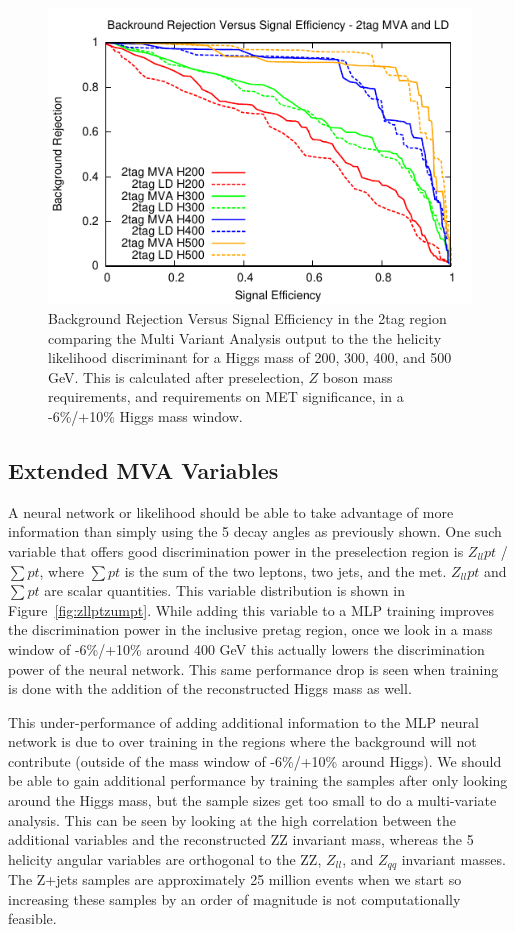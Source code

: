 \begin{figure}[htb!]
\begin{center}
\centerline{
\includegraphics[width=0.6\linewidth]{Optimization/plots/NN/2tag_MVA_LD_ROC.pdf}
}
\caption{
Background Rejection Versus Signal Efficiency in the 2tag region comparing the Multi Variant Analysis output to the the helicity likelihood discriminant for a Higgs mass of 200, 300, 400, and 500 GeV. This is calculated after preselection, $Z$ boson mass requirements, and requirements on MET significance, in a -6\%/+10\% Higgs mass window.
}
\label{fig:nn_2tag_ROC}
\end{center}
\end{figure}



\subsection{Extended MVA Variables}

A neural network or likelihood should be able to take advantage of more information than simply using the 5 decay angles as previously shown. One such variable that offers good discrimination power in the preselection region is $Z_{ll}pt$ / $\sum{pt}$, where $\sum{pt}$ is the sum of the two leptons, two jets, and the met. $Z_{ll}pt$ and $\sum{pt}$ are scalar quantities.  This variable distribution is shown in Figure~\ref{fig:zllptzumpt}. While adding this variable to a MLP training improves the discrimination power in the inclusive pretag region, once we look in a mass window of -6\%/+10\% around 400 GeV this actually lowers the discrimination power of the neural network. This same performance drop is seen when training is done with the addition of the reconstructed Higgs mass as well.

This under-performance of adding additional information to the MLP neural network is due to over training in the regions where the background will not contribute (outside of the mass window of -6\%/+10\% around Higgs).  We should be able to gain additional performance by training the samples after only looking around the Higgs mass, but the sample sizes get too small to do a multi-variate analysis. This can be seen by looking at the high correlation between the additional variables and the reconstructed ZZ invariant mass, whereas the 5 helicity angular variables are orthogonal to the ZZ, $Z_{ll}$, and $Z_{qq}$ invariant masses. The Z+jets samples are approximately 25 million events when we start so increasing these samples by an order of magnitude is not computationally feasible.



